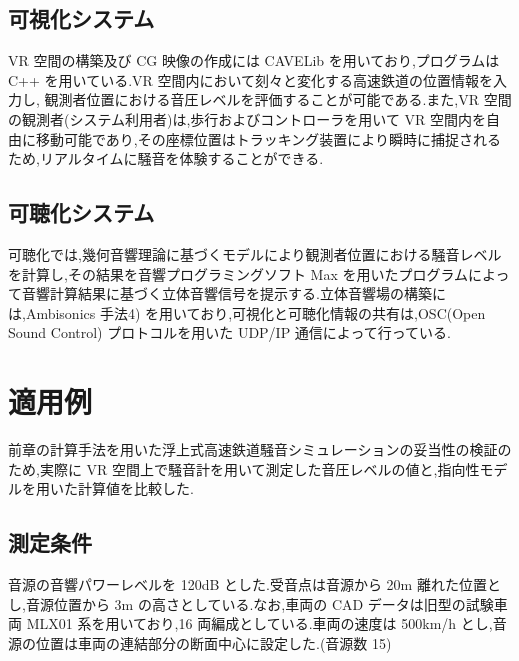 \documentclass[10pt]{jsarticle}
\begin{document}


\subsection{可視化システム}
VR 空間の構築及び CG 映像の作成には CAVELib を用いており,プログラムは C++ を用いている.VR 空間内において刻々と変化する高速鉄道の位置情報を入力し, 観測者位置における音圧レベルを評価することが可能である.また,VR 空間の観測者(システム利用者)は,歩行およびコントローラを用いて VR 空間内を自由に移動可能であり,その座標位置はトラッキング装置により瞬時に捕捉されるため,リアルタイムに騒音を体験することができる.

\subsection{可聴化システム}
可聴化では,幾何音響理論に基づくモデルにより観測者位置における騒音レベルを計算し,その結果を音響プログラミングソフト Max を用いたプログラムによって音響計算結果に基づく立体音響信号を提示する.立体音響場の構築には,Ambisonics 手法4) を用いており,可視化と可聴化情報の共有は,OSC(Open Sound Control) プロトコルを用いた UDP/IP 通信によって行っている.

\section{適用例}
前章の計算手法を用いた浮上式高速鉄道騒音シミュレーションの妥当性の検証のため,実際に VR 空間上で騒音計を用いて測定した音圧レベルの値と,指向性モデルを用いた計算値を比較した.

\subsection{測定条件}
音源の音響パワーレベルを 120dB とした.受音点は音源から 20m 離れた位置とし,音源位置から 3m の高さとしている.なお,車両の CAD データは旧型の試験車両 MLX01 系を用いており,16 両編成としている.車両の速度は 500km/h とし,音源の位置は車両の連結部分の断面中心に設定した.(音源数 15)
\end{document}
